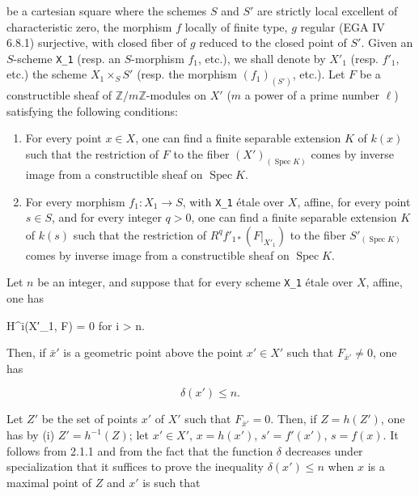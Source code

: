 \documentclass[
]{article}
\newenvironment{Shaded}{}{}
\newcommand{\NormalTok}[1]{#1}
\begin{document}
be a cartesian square where the schemes \(S\) and \(S'\) are strictly
local excellent of characteristic zero, the morphism \(f\) locally of
finite type, \(g\) regular (EGA IV 6.8.1) surjective, with closed fiber
of \(g\) reduced to the closed point of \(S'\). Given an \(S\)-scheme
\texttt{X\_1} (resp. an \(S\)-morphism \(f_{1}\), etc.), we shall denote
by \(X'_{1}\) (resp. \(f'_{1}\), etc.) the scheme
\(X_{1} \times_{S} S'\) (resp. the morphism \((f_{1})_{(S')}\), etc.).
Let \(F\) be a constructible sheaf of \(\mathbb{Z}/m\mathbb{Z}\)-modules
on \(X'\) (\(m\) a power of a prime number \(\ell\)) satisfying the
following conditions:

\begin{enumerate}
\def\labelenumi{(\roman{enumi})}
\item
  For every point \(x \in X\), one can find a finite separable extension
  \(K\) of \(k(x)\) such that the restriction of \(F\) to the fiber
  \((X')_{(\operatorname{Spec} K)}\) comes by inverse image from a
  constructible sheaf on \(\operatorname{Spec} K\).
\item
  For every morphism \(f_{1} : X_{1} \to S\), with \texttt{X\_1} étale
  over \(X\), affine, for every point \(s \in S\), and for every integer
  \(q > 0\), one can find a finite separable extension \(K\) of \(k(s)\)
  such that the restriction of \(R^{q} f'_{1*}(F|_{X'_{1}})\) to the
  fiber \(S'_{(\operatorname{Spec} K)}\) comes by inverse image from a
  constructible sheaf on \(\operatorname{Spec} K\).
\end{enumerate}

Let \(n\) be an integer, and suppose that for every scheme \texttt{X\_1}
étale over \(X\), affine, one has

\begin{Shaded}
\begin{Highlighting}[]
\NormalTok{H\^{}i(X′\_1, F) = 0 for i \textgreater{} n.}
\end{Highlighting}
\end{Shaded}

Then, if \(\bar{x}'\) is a geometric point above the point \(x' \in X'\)
such that \(F_{\bar{x}'} \neq 0\), one has

\[
\delta(x') \leqslant n.
\]

Let \(Z'\) be the set of points \(x'\) of \(X'\) such that
\(F_{\bar{x}'} = 0\). Then, if \(Z = h(Z')\), one has by (i)
\(Z' = h^{-1}(Z)\); let \(x' \in X'\), \(x = h(x')\), \(s' = f'(x')\),
\(s = f(x)\). It follows from 2.1.1 and from the fact that the function
\(\delta\) decreases under specialization that it suffices to prove the
inequality \(\delta(x') \leqslant n\) when \(x\) is a maximal point of
\(Z\) and \(x'\) is such that
\end{document}
